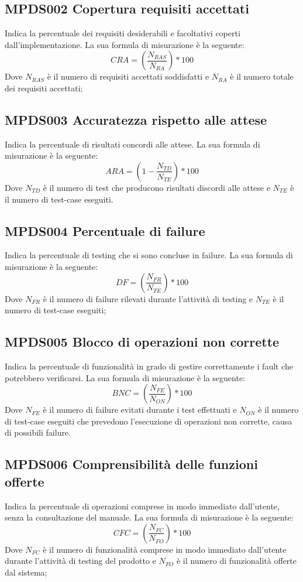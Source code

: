 \documentclass[NormeDiProgetto.tex]{subfiles}
\begin{document}
		\subsection{MPDS002 Copertura requisiti accettati} Indica la percentuale dei requisiti desiderabili e facoltativi coperti dall'implementazione. La sua formula di misurazione è la seguente: \[CRA=(\frac{N_{RAS}}{N_{RA}})*100\] Dove $ N_{RAS} $ è il numero di requisiti accettati soddisfatti e $ N_{RA } $ è il numero totale dei requisiti accettati;
		\subsection{MPDS003 Accuratezza rispetto alle attese} Indica la percentuale di risultati concordi alle attese. La sua formula di misurazione è la seguente: \[ARA=(1-\frac{N_{TD}}{N_{TE}})*100\] Dove $ N_{TD} $ è il numero di test che producono risultati discordi alle attese e $ N_{TE} $ è il numero di test-case eseguiti.
	
\subsection{MPDS004 Percentuale di failure} Indica la percentuale di testing che si sono concluse in failure. La sua formula di misurazione è la seguente: \[DF=(\frac{N_{FR}}{N_{TE}})*100\] Dove $ N_{FR} $ è il numero di failure rilevati durante l'attività di testing e $ N_{TE} $ è il numero di test-case eseguiti;
\subsection{MPDS005 Blocco di operazioni non corrette} Indica la percentuale di funzionalità in grado di gestire correttamente i fault che potrebbero verificarsi. La sua formula di misurazione è la seguente: \[BNC=(\frac{N_{FE}}{N_{ON}})*100\] Dove $ N_{FE} $ è il numero di failure evitati durante i test effettuati e $ N_{ON} $ è il numero di test-case eseguiti che prevedono l'esecuzione di operazioni non corrette, causa di possibili failure.

\subsection{MPDS006 Comprensibilità delle funzioni offerte} Indica la percentuale di operazioni comprese in modo immediato dall'utente, senza la consultazione del manuale. La sua formula di misurazione è la seguente: \[CFC=(\frac{N_{FC}}{N_{FO}})*100\] Dove $ N_{FC} $ è il numero di funzionalità comprese in modo immediato dall'utente durante l'attività di testing del prodotto e $ N_{FO} $ è il numero di funzionalità offerte dal sistema;
\end{document}
